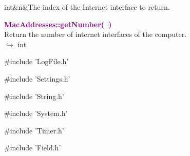 \begin{tcolorbox}[width=\textwidth,myArgs,tabularx={ll|R},title=Arguments of MacAddresses::getInterface]
int&n&The index of the Internet interface to return.
\end{tcolorbox}


\textcolor{purple}{\textbf{MacAddresses::getNumber(~)}}\label{MacAddresses::getNumber()}\\
Return the number of internet interfaces of the computer.\\ \hspace*{10mm}$\hookrightarrow$ int



\#include 'LogFile.h'

\#include 'Settings.h'

\#include 'String.h'

\#include 'System.h'

\#include 'Timer.h'

\#include 'Field.h'
